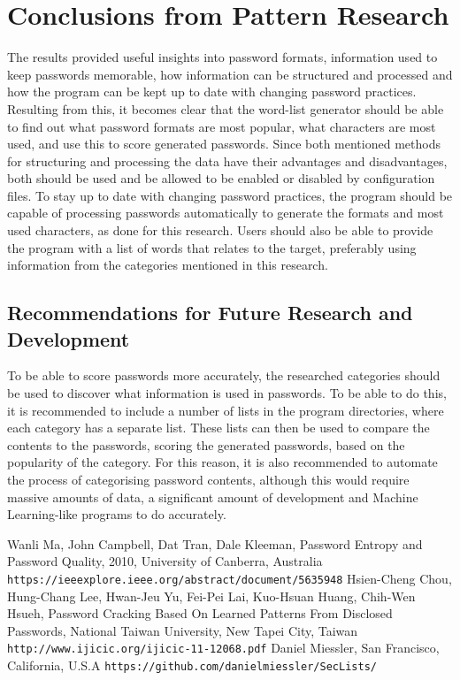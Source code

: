 \documentclass[a4paper,12pt]{article}
\begin{document}
\newpage
\section{Conclusions from Pattern Research}

The results provided useful insights into password formats, information used to keep passwords memorable, how information can be structured and processed and how the program can be kept up to date with changing password practices. Resulting from this, it becomes clear that the word-list generator should be able to find out what password formats are most popular, what characters are most used, and use this to score generated passwords. Since both mentioned methods for structuring and processing the data have their advantages and disadvantages, both should be used and be allowed to be enabled or disabled by configuration files. To stay up to date with changing password practices, the program should be capable of processing passwords automatically to generate the formats and most used characters, as done for this research. Users should also be able to provide the program with a list of words that relates to the target, preferably using information from the categories mentioned in this research.

\subsection{Recommendations for Future Research and Development}

To be able to score passwords more accurately, the researched categories should be used to discover what information is used in passwords. To be able to do this, it is recommended to include a number of lists in the program directories, where each category has a separate list. These lists can then be used to compare the contents to the passwords, scoring the generated passwords, based on the popularity of the category. For this reason, it is also recommended to automate the process of categorising password contents, although this would require massive amounts of data, a significant amount of development and Machine Learning-like programs to do accurately.

\newpage
\begin{thebibliography}{9}
   Wanli Ma, John Campbell, Dat Tran, Dale Kleeman, Password Entropy and Password Quality, 2010, University of Canberra, Australia \texttt{https://ieeexplore.ieee.org/abstract/document/5635948}
   Hsien-Cheng Chou, Hung-Chang Lee, Hwan-Jeu Yu, Fei-Pei Lai, Kuo-Hsuan Huang, Chih-Wen Hsueh, Password Cracking Based On Learned Patterns From Disclosed Passwords, National Taiwan University, New Tapei City, Taiwan \texttt{http://www.ijicic.org/ijicic-11-12068.pdf}
   Daniel Miessler, San Francisco, California, U.S.A \texttt{https://github.com/danielmiessler/SecLists/}
\end{thebibliography}
\end{document}
